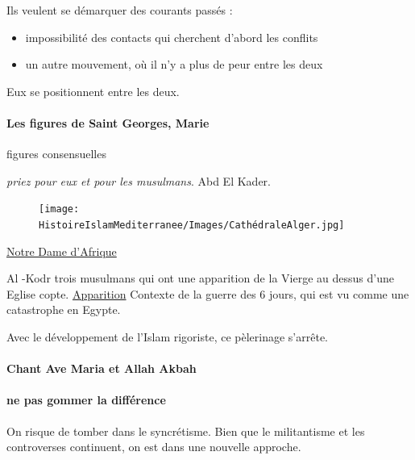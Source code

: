 Ils veulent se démarquer des courants passés :
\begin{itemize}
    \item impossibilité des contacts qui cherchent d'abord les conflits
    \item un autre mouvement, où il n'y a  plus de peur entre les deux
\end{itemize}
Eux se positionnent entre les deux. 

\paragraph{Les figures de Saint Georges, Marie} figures consensuelles

\begin{Ex}
     \textit{priez pour eux et pour les musulmans}. Abd El Kader. 
     \begin{figure}
         \centering
                  \texttt{[image: HistoireIslamMediterranee/Images/CathédraleAlger.jpg]}

         \label{fig:my_label}
     \end{figure}\href{https://fr.wikipedia.org/wiki/Basilique_Notre-Dame-d%27Afrique}{Notre Dame d'Afrique}
\end{Ex}

\begin{Ex}
    Al -Kodr
    trois musulmans qui ont une apparition de la Vierge au dessus d'une Eglise copte.
    \href{https://fr.wikipedia.org/wiki/Notre-Dame_de_Zeitoun#:~:text=Notre%2DDame%20de%20Zeitoun%20est,Caire%2C%20de%201968%20%C3%A0%201971.}{Apparition}
    Contexte de la guerre des 6 jours, qui est vu comme une catastrophe en Egypte.

    Avec le développement de l'Islam rigoriste, ce pèlerinage s'arrête.
\end{Ex}

\paragraph{Chant Ave Maria et Allah Akbah}

\paragraph{ne pas gommer la différence} On risque de tomber dans le syncrétisme. Bien que le militantisme et les controverses continuent, on est dans une nouvelle approche.

